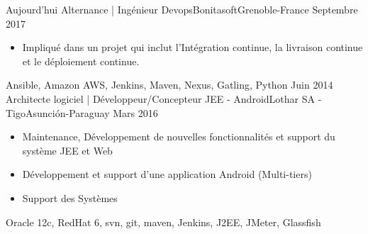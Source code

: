 %
%
%
\begin{experiences}
  \experience
    {Aujourd'hui}   {Alternance | Ingénieur Devops}{Bonitasoft}{Grenoble-France}
    {Septembre 2017} {
                      \begin{itemize}
                        \item Impliqué dans un projet qui inclut l'Intégration continue, la livraison continue et le déploiement continue.
                      \end{itemize}
                    }
                    {Ansible, Amazon AWS, Jenkins, Maven, Nexus, Gatling, Python}
  \emptySeparator
  \experience
    {Juin 2014}   {Architecte logiciel | Développeur/Concepteur JEE - Android}{Lothar SA - Tigo}{Asunción-Paraguay}
    {Mars 2016} {
                      \begin{itemize}
                        \item Maintenance, Développement de nouvelles fonctionnalités et support du système JEE et Web
                        \item Développement et support d'une application Android (Multi-tiers)
                        \item Support des Systèmes
                      \end{itemize}

				}{Oracle 12c, RedHat 6, svn, git, maven, Jenkins, J2EE, JMeter, Glassfish}
  \emptySeparator


\end{experiences}
